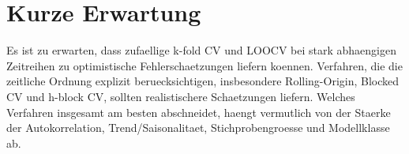 \documentclass[11pt,a4paper]{article}
\begin{document}
\section{Kurze Erwartung}

Es ist zu erwarten, dass zufaellige k-fold CV und LOOCV bei stark abhaengigen
Zeitreihen zu optimistische Fehlerschaetzungen liefern koennen. Verfahren, die
die zeitliche Ordnung explizit beruecksichtigen, insbesondere Rolling-Origin,
Blocked CV und h-block CV, sollten realistischere Schaetzungen liefern. Welches
Verfahren insgesamt am besten abschneidet, haengt vermutlich von der Staerke der
Autokorrelation, Trend/Saisonalitaet, Stichprobengroesse und Modellklasse ab.
\end{document}
